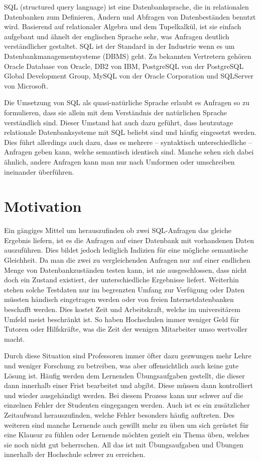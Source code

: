 
SQL (structured query language) ist eine Datenbanksprache, die in relationalen Datenbanken zum Definieren, Ändern und Abfragen von Datenbeständen benutzt wird. Basierend auf relationaler Algebra und dem Tupelkalkül, ist sie einfach aufgebaut und ähnelt der englischen Sprache sehr, was Anfragen deutlich verständlicher gestaltet. SQL ist der Standard in der Industrie wenn es um Datenbankmanagementsysteme (DBMS) geht. Zu bekannten Vertretern gehören Oracle Database von Oracle, DB2 von IBM, PostgreSQL von der PostgreSQL Global Development Group, MySQL von der Oracle Corporation und SQLServer von Microsoft.

Die Umsetzung von SQL als quasi-natürliche Sprache erlaubt es Anfragen so zu formulieren, dass sie allein mit dem Verständnis der natürlichen Sprache verständlich sind. Dieser Umstand hat auch dazu geführt, dass heutzutage relationale Datenbanksysteme mit SQL beliebt sind und häufig eingesetzt werden. 
Dies führt allerdings auch dazu, dass es mehrere -- syntaktisch unterschiedliche -- Anfragen geben kann, welche semantisch identisch sind. Manche sehen sich dabei ähnlich, andere Anfragen kann man nur nach Umformen oder umschreiben ineinander überführen. 

\section{Motivation}

Ein gängiges Mittel um herauszufinden ob zwei SQL-Anfragen das gleiche Ergebnis liefern, ist es die Anfragen auf einer Datenbank mit vorhandenen Daten auszuführen. Dies bildet jedoch lediglich Indizien für eine mögliche semantische Gleichheit. Da man die zwei zu vergleichenden Anfragen nur auf einer endlichen Menge von Datenbankzuständen testen kann, ist nie ausgeschlossen, dass nicht doch ein Zustand existiert, der unterschiedliche Ergebnisse liefert. Weiterhin stehen solche Testdaten nur im begrenzten Umfang zur Verfügung oder Daten müssten händisch eingetragen werden oder von freien Internetdatenbanken beschafft werden. Dies kostet Zeit und Arbeitskraft, welche im universitärem Umfeld meist beschränkt ist. So haben Hochschulen immer weniger Geld für Tutoren oder Hilfskräfte, was die Zeit der wenigen Mitarbeiter umso wertvoller macht.

Durch diese Situation sind Professoren immer öfter dazu gezwungen mehr Lehre und weniger Forschung zu betreiben, was aber offensichtlich auch keine gute Lösung ist. Häufig werden dem Lernenden Übungsaufgaben gestellt, die dieser dann innerhalb einer Frist bearbeitet und abgibt. Diese müssen dann kontrolliert und wieder ausgehändigt werden. Bei diesem Prozess kann nur schwer auf die einzelnen Fehler der Studenten eingegangen werden. Auch ist es ein zusätzlicher Zeitaufwand herauszufinden, welche Fehler besonders häufig auftreten. Des weiteren sind manche Lernende auch gewillt mehr zu üben um sich gerüstet für eine Klausur zu fühlen oder Lernende möchten gezielt ein Thema üben, welches sie noch nicht gut beherrschen. All das ist mit Übungsaufgaben und Übungen innerhalb der Hochschule schwer zu erreichen. 

